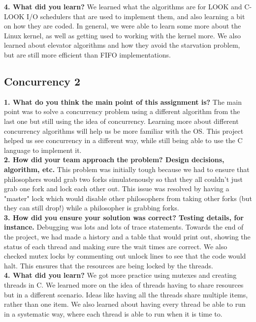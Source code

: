 \documentclass[10pt,a4paper,article]{article}
\begin{document}
\noindent \textbf{4. What did you learn?}
We learned what the algorithms are for LOOK and C-LOOK I/O schedulers that are used to implement them, and also learning a bit on how they are coded. In general, we were able to learn some more about the Linux kernel, as well as getting used to working with the kernel more. We also learned about elevator algorithms and how they avoid the starvation problem, but are still more efficient than FIFO implementations. \\

\subsection{Concurrency 2}

\textbf{1. What do you think the main point of this assignment is?}
The main point was to solve a concurrency problem using a different algorithm from the last one but still using the idea of concurrency. Learning more about different concurrency algorithms will help us be more familiar with the OS. This project helped us see concurrency in a different way, while still being able to use the C language to implement it.  \\

\noindent \textbf{2. How did your team approach the problem? Design decisions, algorithm, etc.}
This problem was initially tough because we had to ensure that philosophers would grab two forks simulatenously so that they all couldn't just grab one fork and lock each other out. This issue was resolved by having a "master" lock which would disable other philosophers from taking other forks (but they can still drop!) while a philosopher is grabbing forks.\\


\noindent \textbf{3. How did you ensure your solution was correct? Testing details, for instance.}
Debugging was lots and lots of trace statements. Towards the end of the project, we had made a history and a table that would print out, showing the status of each thread and making sure the wait times are correct. We also checked mutex locks by commenting out unlock lines to see that the code would halt. This ensures that the resources are being locked by the threads.  \\

\noindent \textbf{4. What did you learn?}
We got more practice using mutexes and creating threads in C. We learned more on the idea of threads having to share resources but in a different scenario. Ideas like having all the threads share multiple items, rather than one item. We also learned about having every thread be able to run in a systematic way, where each thread is able to run when it is time to.  \\
\end{document}
